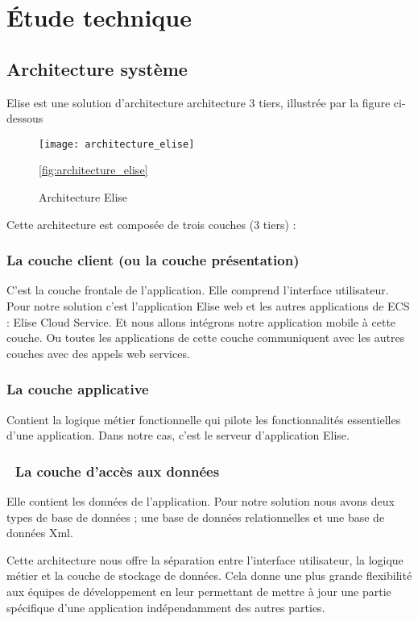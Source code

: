 \section{Étude technique}
\subsection{Architecture système}
Elise est une solution d'architecture architecture 3 tiers, illustrée par la figure ci-dessous 
\begin{figure}[H]
  \centering
  \texttt{[image: architecture\_elise]}
  \caption{Architecture Elise}
  \ref{fig:architecture_elise}
\end{figure}
Cette architecture est composée de trois couches (3 tiers) :

\subsubsection{La couche client (ou la couche présentation)}
C'est la couche frontale de l'application. Elle comprend l'interface utilisateur. Pour notre solution c'est l'application Elise web et les autres applications de ECS : Elise Cloud Service. Et nous allons intégrons notre application mobile à cette couche. Ou toutes les applications de cette couche communiquent avec les autres couches avec des appels web services.

\subsubsection{La couche applicative}
Contient la logique métier fonctionnelle qui pilote les fonctionnalités essentielles d'une application. Dans notre cas, c'est le serveur d'application Elise.

\subsubsection{	La couche d'accès aux données}
Elle contient les données de l'application. Pour notre solution nous avons deux types de base de données ; une base de données relationnelles et une base de données Xml.

Cette architecture nous offre la séparation entre l'interface utilisateur, la logique métier et la couche de stockage de données. Cela donne une plus grande flexibilité aux équipes de développement en leur permettant de mettre à jour une partie spécifique d'une application indépendamment des autres parties.

